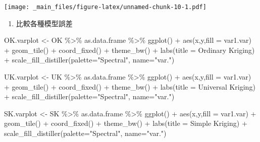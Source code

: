 \documentclass[
]{book}
\newenvironment{Shaded}{\begin{snugshade}}{\end{snugshade}}
\newcommand{\AttributeTok}[1]{\textcolor[rgb]{0.77,0.63,0.00}{#1}}
\newcommand{\FunctionTok}[1]{\textcolor[rgb]{0.00,0.00,0.00}{#1}}
\newcommand{\NormalTok}[1]{#1}
\newcommand{\OtherTok}[1]{\textcolor[rgb]{0.56,0.35,0.01}{#1}}
\newcommand{\SpecialCharTok}[1]{\textcolor[rgb]{0.00,0.00,0.00}{#1}}
\newcommand{\StringTok}[1]{\textcolor[rgb]{0.31,0.60,0.02}{#1}}
\providecommand{\tightlist}{%
  \setlength{\itemsep}{0pt}\setlength{\parskip}{0pt}}
\begin{document}
\texttt{[image: \_main\_files/figure-latex/unnamed-chunk-10-1.pdf]}

\begin{enumerate}
\def\labelenumi{\arabic{enumi}.}
\setcounter{enumi}{5}
\tightlist
\item
  比較各種模型誤差
\end{enumerate}

\begin{Shaded}
\begin{Highlighting}[]
\NormalTok{OK.varplot }\OtherTok{\textless{}{-}}\NormalTok{ OK }\SpecialCharTok{\%\textgreater{}\%}\NormalTok{ as.data.frame }\SpecialCharTok{\%\textgreater{}\%}
  \FunctionTok{ggplot}\NormalTok{() }\SpecialCharTok{+} \FunctionTok{aes}\NormalTok{(x,y,}\AttributeTok{fill =}\NormalTok{ var1.var) }\SpecialCharTok{+} 
  \FunctionTok{geom\_tile}\NormalTok{() }\SpecialCharTok{+} \FunctionTok{coord\_fixed}\NormalTok{() }\SpecialCharTok{+} \FunctionTok{theme\_bw}\NormalTok{() }\SpecialCharTok{+} \FunctionTok{labs}\NormalTok{(}\AttributeTok{title =} \StringTok{\textquotesingle{}Ordinary Kriging\textquotesingle{}}\NormalTok{) }\SpecialCharTok{+} 
  \FunctionTok{scale\_fill\_distiller}\NormalTok{(}\AttributeTok{palette=}\StringTok{"Spectral"}\NormalTok{, }\AttributeTok{name=}\StringTok{"var."}\NormalTok{)}

\NormalTok{UK.varplot }\OtherTok{\textless{}{-}}\NormalTok{ UK }\SpecialCharTok{\%\textgreater{}\%}\NormalTok{ as.data.frame }\SpecialCharTok{\%\textgreater{}\%}
  \FunctionTok{ggplot}\NormalTok{() }\SpecialCharTok{+} \FunctionTok{aes}\NormalTok{(x,y,}\AttributeTok{fill =}\NormalTok{ var1.var) }\SpecialCharTok{+} 
  \FunctionTok{geom\_tile}\NormalTok{() }\SpecialCharTok{+} \FunctionTok{coord\_fixed}\NormalTok{() }\SpecialCharTok{+} \FunctionTok{theme\_bw}\NormalTok{() }\SpecialCharTok{+} \FunctionTok{labs}\NormalTok{(}\AttributeTok{title =} \StringTok{\textquotesingle{}Universal Kriging\textquotesingle{}}\NormalTok{) }\SpecialCharTok{+} 
  \FunctionTok{scale\_fill\_distiller}\NormalTok{(}\AttributeTok{palette=}\StringTok{"Spectral"}\NormalTok{, }\AttributeTok{name=}\StringTok{"var."}\NormalTok{)}

\NormalTok{SK.varplot }\OtherTok{\textless{}{-}}\NormalTok{ SK }\SpecialCharTok{\%\textgreater{}\%}\NormalTok{ as.data.frame }\SpecialCharTok{\%\textgreater{}\%}
  \FunctionTok{ggplot}\NormalTok{() }\SpecialCharTok{+} \FunctionTok{aes}\NormalTok{(x,y,}\AttributeTok{fill =}\NormalTok{ var1.var) }\SpecialCharTok{+} 
  \FunctionTok{geom\_tile}\NormalTok{() }\SpecialCharTok{+} \FunctionTok{coord\_fixed}\NormalTok{() }\SpecialCharTok{+} \FunctionTok{theme\_bw}\NormalTok{() }\SpecialCharTok{+} \FunctionTok{labs}\NormalTok{(}\AttributeTok{title =} \StringTok{\textquotesingle{}Simple Kriging\textquotesingle{}}\NormalTok{) }\SpecialCharTok{+} 
  \FunctionTok{scale\_fill\_distiller}\NormalTok{(}\AttributeTok{palette=}\StringTok{"Spectral"}\NormalTok{, }\AttributeTok{name=}\StringTok{"var."}\NormalTok{)}


\end{Highlighting}
\end{Shaded}
\end{document}
